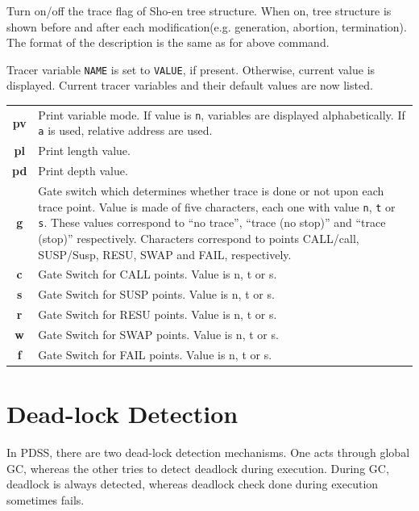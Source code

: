 \begin{itemize}
Turn on/off the trace flag of Sho-en tree structure. When on, tree structure is
shown before and after each modification(e.g. generation, abortion,
termination). The format of the description is the same as for above command.

Tracer variable \verb|NAME| is set to \verb|VALUE|, if present. Otherwise,
current value is displayed.
Current tracer variables and their default values are now listed.
\vspace{1ex}\\
\hspace*{15mm}\begin{tabular}{c@{ :: }p{120mm}}
{\bf pv} & Print variable mode. If value is \verb|n|, variables are displayed
alphabetically. If \verb|a| is used, relative address are used.\\
{\bf pl} & Print length value.\\
{\bf pd} & Print depth value.\\
{\bf g} & Gate switch which determines whether trace is done or not upon each
trace point. Value is made of five characters, each one with value \verb|n|,
\verb|t| or \verb|s|. These values correspond to ``no trace'',
``trace (no stop)'' and ``trace (stop)'' respectively.
Characters correspond to points CALL/call,
SUSP/Susp, RESU, SWAP and FAIL, respectively.\\
{\bf c}  & Gate Switch for CALL points. Value is n, t or s.\\
{\bf s}  & Gate Switch for SUSP points. Value is n, t or s.\\
{\bf r}  & Gate Switch for RESU points. Value is n, t or s.\\
{\bf w}  & Gate Switch for SWAP points. Value is n, t or s.\\
{\bf f}  & Gate Switch for FAIL points. Value is n, t or s.\\
\end{tabular}
\vspace{1ex}
\end{itemize}

\newpage
\section{Dead-lock Detection}
\label{sec-deadlock}

In PDSS, there are two dead-lock detection mechanisms. One acts through global
GC, whereas the other tries to detect deadlock during execution. During GC,
deadlock is always detected, whereas deadlock check done
during execution sometimes fails.

